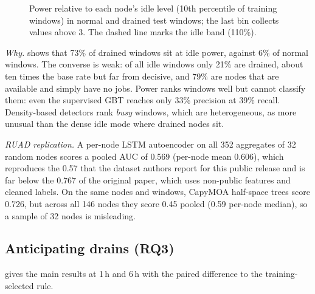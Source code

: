 \begin{figure}[t]
\centering
{}
\caption{Power relative to each node's idle level (10th percentile of training windows) in normal and drained test windows; the last bin collects values above 3. The dashed line marks the idle band (110\%).}
\label{fig:power}
\end{figure}

\emph{Why.}  shows that 73\% of drained windows sit at idle power, against 6\% of normal windows. The converse is weak: of all idle windows only 21\% are drained, about ten times the base rate but far from decisive, and 79\% are nodes that are available and simply have no jobs. Power ranks windows well but cannot classify them: even the supervised GBT reaches only 33\% precision at 39\% recall. Density-based detectors rank \emph{busy} windows, which are heterogeneous, as more unusual than the dense idle mode where drained nodes sit.

\emph{RUAD replication.} A per-node LSTM autoencoder on all 352 aggregates of 32 random nodes scores a pooled AUC of 0.569 (per-node mean 0.606), which reproduces the 0.57 that the dataset authors report for this public release and is far below the 0.767 of the original paper, which uses non-public features and cleaned labels. On the same nodes and windows, CapyMOA half-space trees score 0.726, but across all 146 nodes they score 0.45 pooled (0.59 per-node median), so a sample of 32 nodes is misleading.

\subsection{Anticipating drains (RQ3)}
\label{sec:anticipation}
 gives the main results at 1\,h and 6\,h with the paired difference to the training-selected rule.

